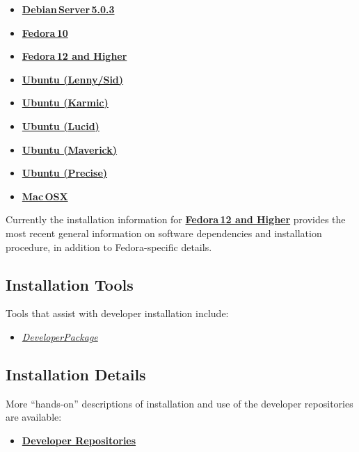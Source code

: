 \documentclass[12pt]{article}
\begin{document}
\begin{itemize}
   \item[]\href{../installation-debian-server/installation-debian-server.tex}{\bf Debian\,Server\,5.0.3}
   \item[]\href{../installation-fedora10/installation-fedora10.tex}{\bf Fedora\,10}
   \item[]\href{../installation-fedora12/installation-fedora12.tex}{\bf Fedora\,12 and Higher}
   \item[]\href{../installation-ubuntu-lennysid/installation-ubuntu-lennysid.tex}{\bf Ubuntu (Lenny/Sid)}
   \item[]\href{../installation-ubuntu-karmic/installation-ubuntu-karmic.tex}{\bf Ubuntu (Karmic)}
   \item[]\href{../installation-ubuntu-lucid/installation-ubuntu-lucid.tex}{\bf Ubuntu (Lucid)}
   \item[]\href{../installation-ubuntu-maverick/installation-ubuntu-maverick.tex}{\bf Ubuntu (Maverick)}
   \item[]\href{../installation-ubuntu-precise/installation-ubuntu-precise.tex}{\bf Ubuntu (Precise)}
   \item[]\href{../installation-osx/installation-osx.tex}{\bf Mac\,OSX}
\end{itemize}

Currently the installation information for
\href{../installation-fedora12/installation-fedora12.tex} {\bf
  Fedora\,12 and Higher} provides the most recent general information
on software dependencies and installation procedure, in addition to
Fedora-specific details.


\subsection*{Installation Tools}
Tools that assist with developer installation include:
\begin{itemize}
   \item[]\href{../developer-package/developer-package.tex}{\it DeveloperPackage}
\end{itemize}

\subsection*{Installation Details}
More ``hands-on'' descriptions of installation and use of the developer repositories are available:
\begin{itemize}
   \item[]\href{../developer-repository/developer-repository.tex}{\bf Developer Repositories}
\end{itemize}
\end{document}
